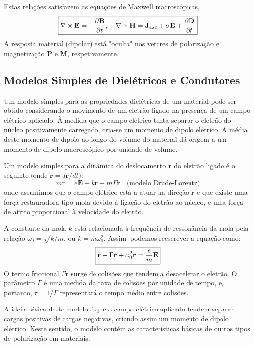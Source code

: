 \begin{check}
    Estas relações satisfazem as equações de Maxwell macroscópicas,
    $$
        \boxed{%
            \nabla \times \mathbf{E} = -\frac{\partial \mathbf{B}}{\partial t},
            \quad
            \nabla \times \mathbf{H} = \mathbf{J}_{ext} + \sigma \mathbf{E} + \dfrac{\partial \mathbf{D}}{\partial t}
        }
    $$
    A resposta material (dipolar) está "oculta" nos vetores de polarização e magnetização $\mathbf{P}$ e $\mathbf{M}$, respetivamente.
\end{check}

\subsection{Modelos Simples de Dielétricos e Condutores}

Um modelo simples para as propriedades dielétricas de um material pode ser obtido considerando o movimento de um eletrão ligado na presença de um campo elétrico aplicado. À medida que o campo elétrico tenta separar o eletrão do núcleo positivamente carregado, cria-se um momento de dipolo elétrico. A média deste momento de dipolo ao longo do volume do material dá origem a um momento de dipolo macroscópico por unidade de volume.

Um modelo simples para a dinâmica do deslocamento $\mathbf{r}$ do eletrão ligado é o seguinte (onde $\dot{\mathbf{r}} = d\mathbf{r}/dt$):
$$
    m\ddot{\mathbf{r}} = e \mathbf{E} - k\mathbf{r} - m\Gamma\dot{\mathbf{r}}
    \quad \text{(modelo Drude-Lorentz)}
$$
onde assumimos que o campo elétrico está a atuar na direção $\mathbf{r}$ e que existe uma força restauradora tipo-mola devido à ligação do eletrão ao núcleo, e uma força de atrito proporcional à velocidade do eletrão.

A constante da mola $k$ está relacionada à frequência de ressonância da mola pela relação $\omega_0 = \sqrt{k/m}$, ou $k = m\omega_0^2$. Assim, podemos reescrever a equação como:
$$
    \boxed{%
        \ddot{\mathbf{r}} + \Gamma\dot{\mathbf{r}} + \omega_0^2 \mathbf{r} = \frac{e}{m} \mathbf{E}
    }
$$
O termo friccional $\Gamma\dot{\mathbf{r}}$ surge de colisões que tendem a desacelerar o eletrão. O parâmetro $\Gamma$ é uma medida da taxa de colisões por unidade de tempo, e, portanto, $\tau = 1/\Gamma$ representará o tempo médio entre colisões.

\begin{check}
    A ideia básica deste modelo é que o campo elétrico aplicado tende a separar cargas positivas de cargas negativas, criando assim um momento de dipolo elétrico. Neste sentido, o modelo contém as características básicas de outros tipos de polarização em materiais.
\end{check}


